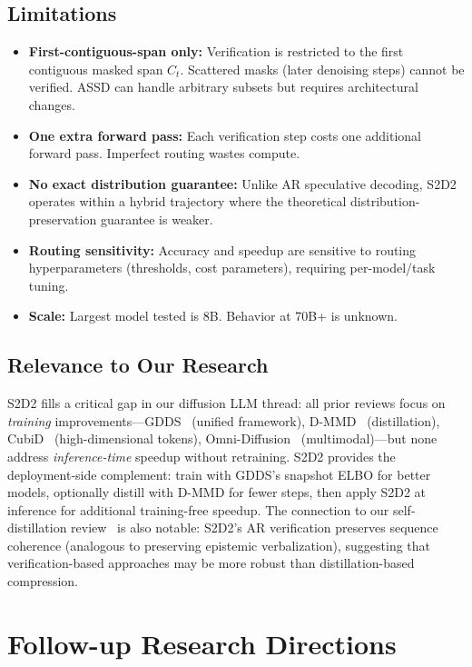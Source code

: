 \documentclass[11pt]{article}
\begin{document}
\subsection{Limitations}

\begin{itemize}
    \item \textbf{First-contiguous-span only:} Verification is restricted to the first contiguous masked span $C_t$. Scattered masks (later denoising steps) cannot be verified. ASSD can handle arbitrary subsets but requires architectural changes.
    \item \textbf{One extra forward pass:} Each verification step costs one additional forward pass. Imperfect routing wastes compute.
    \item \textbf{No exact distribution guarantee:} Unlike AR speculative decoding, S2D2 operates within a hybrid trajectory where the theoretical distribution-preservation guarantee is weaker.
    \item \textbf{Routing sensitivity:} Accuracy and speedup are sensitive to routing hyperparameters (thresholds, cost parameters), requiring per-model/task tuning.
    \item \textbf{Scale:} Largest model tested is 8B. Behavior at 70B+ is unknown.
\end{itemize}

\subsection{Relevance to Our Research}

S2D2 fills a critical gap in our diffusion LLM thread: all prior reviews focus on \textit{training} improvements---GDDS~\cite{gdds} (unified framework), D-MMD~\cite{dmmd} (distillation), CubiD~\cite{cubid} (high-dimensional tokens), Omni-Diffusion~\cite{omnidiffusion} (multimodal)---but none address \textit{inference-time} speedup without retraining. S2D2 provides the deployment-side complement: train with GDDS's snapshot ELBO for better models, optionally distill with D-MMD for fewer steps, then apply S2D2 at inference for additional training-free speedup. The connection to our self-distillation review~\cite{selfdistill} is also notable: S2D2's AR verification preserves sequence coherence (analogous to preserving epistemic verbalization), suggesting that verification-based approaches may be more robust than distillation-based compression.

\section{Follow-up Research Directions}
\end{document}
